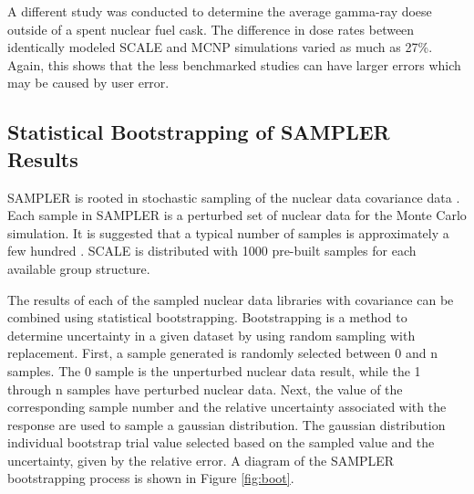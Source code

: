 A different study was conducted to determine the average gamma-ray doese outside of a spent nuclear fuel cask\cite{Chen2011}. 
The difference in dose rates between identically modeled SCALE and MCNP simulations varied as much as 27\%. 
Again, this shows that the less benchmarked studies can have larger errors which may be caused by user error. %


\subsection{Statistical Bootstrapping of SAMPLER Results}

SAMPLER is rooted in stochastic sampling of the nuclear
data covariance data \cite{SCALE}. Each sample in SAMPLER is a
perturbed set of nuclear data for the Monte Carlo simulation. It
is suggested that a typical number of samples is approximately
a few hundred \cite{SCALE}. SCALE is distributed with 1000 pre-built samples
for each available group structure.

The results of each of the sampled nuclear data libraries
with covariance can be combined using statistical bootstrapping.
Bootstrapping is a method to determine uncertainty in a
given dataset by using random sampling with replacement.
First, a sample generated is randomly selected between 0
and n samples. The 0 sample is the unperturbed nuclear data
result, while the 1 through n samples have perturbed nuclear
data. Next, the value of the corresponding sample number and
the relative uncertainty associated with the response are used
to sample a gaussian distribution. The gaussian distribution
individual bootstrap trial value selected based on the sampled
value and the uncertainty, given by the relative error. A diagram of the SAMPLER bootstrapping process is shown in Figure \ref{fig:boot}. 

